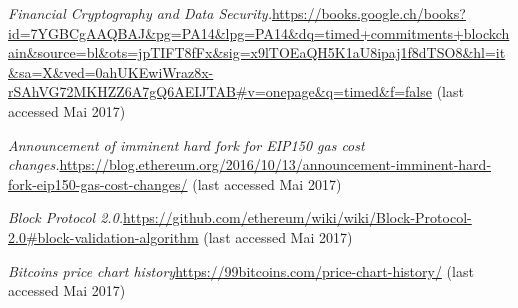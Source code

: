 \begin{thebibliography}{99}
\emph{Financial Cryptography and Data Security.}\url{https://books.google.ch/books?id=7YGBCgAAQBAJ&pg=PA14&lpg=PA14&dq=timed+commitments+blockchain&source=bl&ots=jpTIFT8fFx&sig=x9lTOEaQH5K1aU8ipaj1f8dTSO8&hl=it&sa=X&ved=0ahUKEwiWraz8x-rSAhVG72MKHZZ6A7gQ6AEIJTAB#v=onepage&q=timed&f=false} (last accessed Mai 2017)


\emph{Announcement of imminent hard fork for EIP150 gas cost changes.}\url{https://blog.ethereum.org/2016/10/13/announcement-imminent-hard-
fork-eip150-gas-cost-changes/} (last accessed Mai 2017)

\emph{Block Protocol 2.0.}\url{https://github.com/ethereum/wiki/wiki/Block-Protocol-2.0#block-validation-algorithm} (last accessed Mai 2017)

\emph{Bitcoins price chart history}\url{https://99bitcoins.com/price-chart-history/} (last accessed Mai 2017)









\end{thebibliography}
